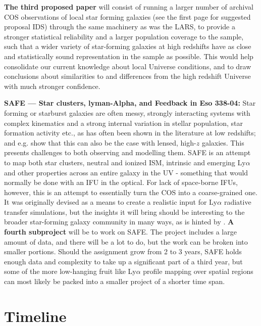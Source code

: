 \documentclass[10pt, letterpaper, headings=Large, DIV=14]{scrartcl}
\begin{document}
\textbf{The third proposed paper} will consist of running a larger number of
archival COS observations of local star forming galaxies (see the first page for
suggested proposal IDS) through the same
machinery as was the LARS, to provide a stronger statistical reliability and a
larger population coverage to the sample, such that a wider variety of
star-forming galaxies at high redshifts have as close and statistically sound
representation in the sample as possible. This would help consolidate our
current knowledge about local Universe conditions, and to draw conclusions about
similarities to and differences from the high redshift Universe with much
stronger confidence.  \newline 



\noindent
{\bfseries \sffamily SAFE --- Star clusters, lyman-Alpha, and Feedback in Eso
338-04: } Star forming or starburst galaxies are often messy, strongly interacting
systems with complex kinematics and a strong internal variation in stellar
population, star formation activity etc., as has often been shown in the
literature at  low redshifts; and e.g. \cite{Bayliss2014} show that this can
also be the case with lensed, high-$z$ galaxies. This presents challenges to
both observing and modelling them. 
SAFE is an attempt to map both star clusters, neutral and ionized ISM, intrinsic
and emerging Ly$\alpha$ and other properties across an entire galaxy in the UV -
something that would normally be done with an IFU in the optical. For lack of
space-borne IFUs, however, this is an attempt to essentially turn the COS into a
coarse-grained one. It was originally devised as a means to create a realistic
input for Ly$\alpha$ radiative transfer simulations, but the insights it will
bring should be interesting to the broader star-forming galaxy community in many
ways, as is hinted by \cite{Bayliss2014}. 
\textbf{ A fourth subproject} will be to work on SAFE. The project includes a
large amount of data, and there will be a lot to do, but the work can be broken
into smaller portions. Should the assignment grow from 2 to 3 years, SAFE holds
enough data and complexity to take up a significant part of a third year, but
some of the more low-hanging fruit like Ly$\alpha$ profile mapping over spatial
regions can most likely be packed into a smaller project of a shorter time span. 

\section*{Timeline}
\end{document}
